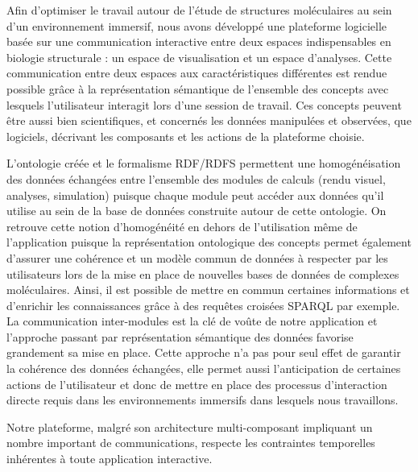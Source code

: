 Afin d'optimiser le travail autour de l'étude de structures moléculaires au sein d'un environnement immersif, nous avons développé une plateforme logicielle basée sur une communication interactive entre deux espaces indispensables en biologie structurale : un espace de visualisation et un espace d'analyses. Cette communication entre deux espaces aux caractéristiques différentes est rendue possible grâce à la représentation sémantique de l'ensemble des concepts avec lesquels l'utilisateur interagit lors d'une session de travail. Ces concepts peuvent être aussi bien scientifiques, et concernés les données manipulées et observées, que logiciels, décrivant les composants et les actions de la plateforme choisie. 

L'ontologie créée et le formalisme RDF/RDFS permettent une homogénéisation des données échangées entre l'ensemble des modules de calculs (rendu visuel, analyses, simulation) puisque chaque module peut accéder aux données qu'il utilise au sein de la base de données construite autour de cette ontologie. On retrouve cette notion d'homogénéité en dehors de l'utilisation même de l'application puisque la représentation ontologique des concepts permet également d'assurer une cohérence et un modèle commun de données à respecter par les utilisateurs lors de la mise en place de nouvelles bases de données de complexes moléculaires. Ainsi, il est possible de mettre en commun certaines informations et d'enrichir les connaissances grâce à des requêtes croisées SPARQL par exemple. La communication inter-modules est la clé de voûte de notre application et l'approche passant par représentation sémantique des données favorise grandement sa mise en place. Cette approche n'a pas pour seul effet de garantir la cohérence des données échangées, elle permet aussi l'anticipation de certaines actions de l'utilisateur et donc de mettre en place des processus d'interaction directe requis dans les environnements immersifs dans lesquels nous travaillons.

Notre plateforme, malgré son architecture multi-composant impliquant un nombre important de communications, respecte les contraintes temporelles inhérentes à toute application interactive. 

